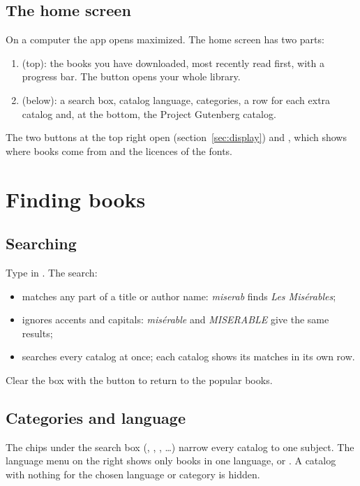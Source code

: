 \documentclass[11pt]{article}
\begin{document}
\subsection{The home screen}
On a computer the app opens maximized. The home screen has two parts:

\begin{enumerate}
  \item {} (top): the books you have downloaded, most recently read first, with
        a progress bar. The  button opens your whole library.
  \item {} (below): a search box, catalog language, categories, a row for
        each extra catalog and, at the bottom, the Project Gutenberg catalog.
\end{enumerate}


The two buttons at the top right open  (section~\ref{sec:display})
and , which shows where books come from and the licences of the fonts.

\section{Finding books}

\subsection{Searching}
Type in . The search:
\begin{itemize}
  \item matches any part of a title or author name: \emph{miserab} finds \emph{Les Misérables};
  \item ignores accents and capitals: \emph{misérable} and \emph{MISERABLE} give the same results;
  \item searches every catalog at once; each catalog shows its matches in its own row.
\end{itemize}
Clear the box with the  button to return to the popular books.

\subsection{Categories and language}
The chips under the search box (, , , …)
narrow every catalog to one subject. The language menu on the right shows only books in one
language, or . A catalog with nothing for the chosen language or category is
hidden.
\end{document}

